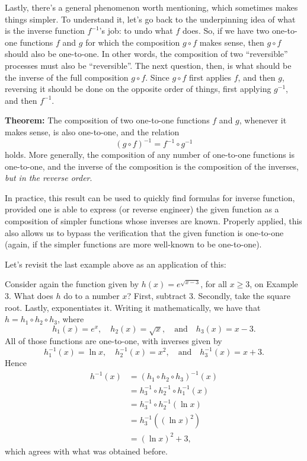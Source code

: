 \documentclass[nooutcomes]{ximera}
\begin{document}
Lastly, there's a general phenomenon worth mentioning, which sometimes makes things simpler. To understand it, let's go back to the underpinning idea of what is the inverse function $f^{-1}$'s job: to undo what $f$ does.  So, if we have two one-to-one functions $f$ and $g$ for which the composition $g\circ f$ makes sense, then $g\circ f$ should also be one-to-one. In other words, the composition of two ``reversible'' processes must also be ``reversible''. The next question, then, is what should be the inverse of the full composition $g\circ f$. Since $g\circ f$ first applies $f$, and then $g$, reversing it should be done on the opposite order of things, first applying $g^{-1}$, and then $f^{-1}$.

\begin{callout}
  {\bf Theorem:} The composition of two one-to-one functions $f$ and $g$, whenever it makes sense, is also one-to-one, and the relation $$(g\circ f)^{-1} = f^{-1}\circ g^{-1}$$ holds. More generally, the composition of any number of one-to-one functions is one-to-one, and the inverse of the composition is the composition of the inverses, \emph{but in the reverse order}.
\end{callout}

In practice, this result can be used to quickly find formulas for inverse function, provided one is able to express (or reverse engineer) the given function as a composition of simpler functions whose inverses are known. Properly applied, this also allows us to bypass the verification that the given function is one-to-one (again, if the simpler functions are more well-known to be one-to-one). 

Let's revisit the last example above as an application of this:

\begin{example}
  Consider again the function given by $h(x) = e^{\sqrt{x-3}}$, for all $x\geq 3$, on Example 3. What does $h$ do to a number $x$? First, subtract $3$. Secondly, take the square root. Lastly, exponentiates it. Writing it mathematically, we have that $h = h_1\circ h_2\circ h_3$, where $$h_1(x) =e^x,\quad h_2(x) = \sqrt{x},\quad\mbox{and}\quad h_3(x)= x-3.$$All of those functions are one-to-one, with inverses given by $$h_1^{-1}(x) = \ln x,\quad h_2^{-1}(x) = x^2,\quad\mbox{and}\quad h_3^{-1}(x) = x+3.$$Hence \begin{align*}h^{-1}(x) &= (h_1\circ h_2\circ h_3)^{-1}(x) \\ &= h_3^{-1}\circ h_2^{-1} \circ h_1^{-1}(x) \\ &= h_3^{-1}\circ h_2^{-1}(\ln x) \\ &= h_3^{-1}((\ln x)^2) \\ &= (\ln x)^2 + 3, \end{align*}which agrees with what was obtained before.
\end{example}
\end{document}
